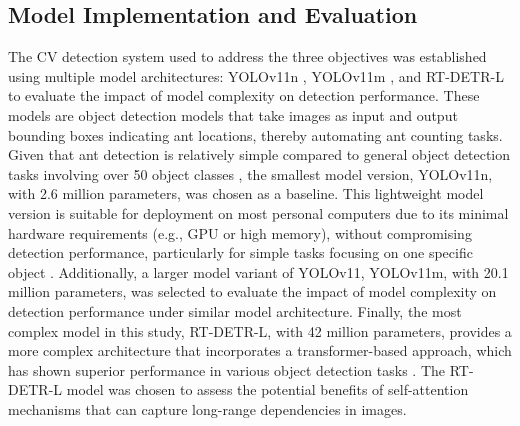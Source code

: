 \subsection{Model Implementation and Evaluation}

The CV detection system used to address the three objectives was established using multiple model architectures: YOLOv11n \cite{jocher_yolo_2023}, YOLOv11m \cite{jocher_yolo_2023}, and RT-DETR-L \cite{ultralytics_rt-detr_nodate,lv_rtdetrv2_2024} to evaluate the impact of model complexity on detection performance. These models are object detection models that take images as input and output bounding boxes indicating ant locations, thereby automating ant counting tasks. Given that ant detection is relatively simple compared to general object detection tasks involving over 50 object classes \cite{everingham_pascal_2010,lin_microsoft_2015}, the smallest model version, YOLOv11n, with 2.6 million parameters, was chosen as a baseline. This lightweight model version is suitable for deployment on most personal computers due to its minimal hardware requirements (e.g., GPU or high memory), without compromising detection performance, particularly for simple tasks focusing on one specific object \cite{das_evaluating_2025}. Additionally, a larger model variant of YOLOv11, YOLOv11m, with 20.1 million parameters, was selected to evaluate the impact of model complexity on detection performance under similar model architecture. Finally, the most complex model in this study, RT-DETR-L, with 42 million parameters, provides a more complex architecture that incorporates a transformer-based approach, which has shown superior performance in various object detection tasks \cite{ultralytics_rt-detr_nodate,lv_rtdetrv2_2024}. The RT-DETR-L model was chosen to assess the potential benefits of self-attention mechanisms that can capture long-range dependencies in images.

